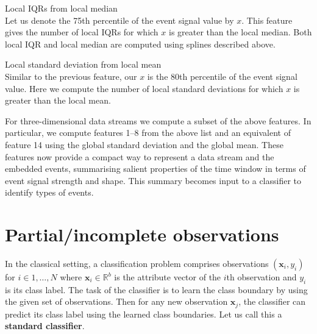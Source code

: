 \documentclass[a4paper,11pt]{article}
\begin{document}
\begin{compactenum}
	\item Local IQRs from local median \\
	      Let us denote the 75th percentile of the event signal value by $x$. This feature gives the number of local IQRs for which $x$ is greater than the local median. Both local IQR and local median are computed using splines described above.
	\item Local standard deviation from local mean \\
	      Similar to the previous feature, our $x$ is the 80th percentile of the event signal value. Here we compute the number of local standard deviations for which $x$ is greater than the local mean.
\end{compactenum}

For three-dimensional data streams we compute a subset of the above features. In particular, we compute features 1--8 from the above list and an equivalent of feature 14 using the global standard deviation and the global mean.  These features now provide a compact way to represent a data stream and the embedded events, summarising salient properties of the time window in terms of event signal strength and shape. This summary becomes input to a classifier to identify types of events.


\section{Partial/incomplete observations} \label{sec:Notation}

In the classical setting, a classification problem comprises observations $(\bm{x}_i, y_i)$ for $i \in 1,\dots, N$ where $\bm{x}_i \in \mathbb{R}^b$ is the attribute vector of the $i$th observation and $y_i$ is its class label. The task of the classifier is to learn the class boundary by using the given set of observations. Then for any new observation $\bm{x}_j$, the classifier can predict its class label using the learned class boundaries. Let us call this a \textbf{standard classifier}.
\end{document}

